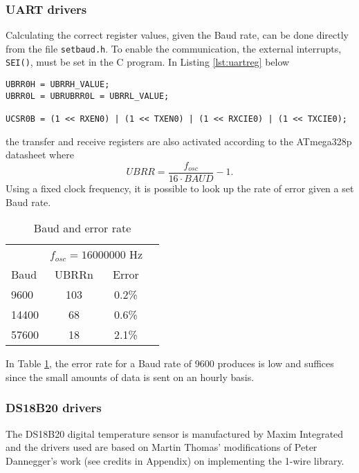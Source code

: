 \subsubsection{UART drivers}%
\label{ssub:uart_drivers}
Calculating the correct register values, given the Baud rate, can be done directly from the file \verb|setbaud.h|. To enable the communication, the external interrupts, \verb|SEI()|, must be set in the C program. In Listing \ref{lst:uartreg} below
\begin{lstlisting}[caption={Enabling UART on the ATmega328p}, label={lst:uartreg}]
UBRR0H = UBRRH_VALUE;
UBRR0L = UBRUBRR0L = UBRRL_VALUE;

UCSR0B = (1 << RXEN0) | (1 << TXEN0) | (1 << RXCIE0) | (1 << TXCIE0);
\end{lstlisting}
the transfer and receive registers are also activated according to the ATmega328p datasheet \cite{atmega328p} where  
\begin{equation}
  UBRR = \frac{f_{osc}}{16\cdot BAUD} -1.
\end{equation}
Using a fixed clock frequency, it is possible to look up the rate of error given a set Baud rate. 
\begin{table}[h]
  \centering
  \caption{Baud and error rate}
  \label{tab:bauderr}
  \begin{tabular}{lccl}\toprule
  & \multicolumn{2}{c}{$f_{osc} = 16000000$ Hz}
  \\\cmidrule(lr){2-3}
  Baud & UBRRn  & Error \\\midrule
  9600 & 103 & 0.2\% \\
  14400 & 68 & 0.6\% \\
  57600 & 18 & 2.1\% \\\bottomrule
  \end{tabular}
\end{table}

In Table \ref{tab:bauderr}, the error rate for a Baud rate of 9600 produces is low and suffices since the small amounts of data is sent on an hourly basis. 

\subsubsection{DS18B20 drivers}%
\label{ssub:ds18b20_drivers}
The DS18B20 digital temperature sensor is manufactured by Maxim Integrated and the drivers used are based on Martin Thomas' modifications of Peter Dannegger's work (see credits in Appendix) on implementing the 1-wire library. 


